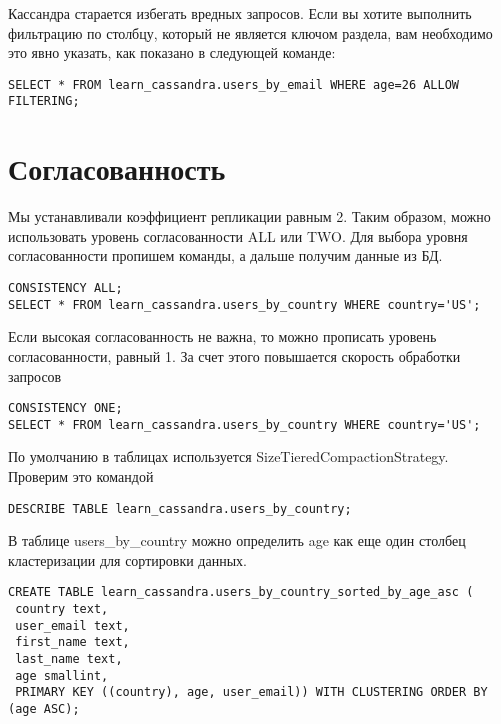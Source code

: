 Кассандра старается избегать вредных запросов.
Если вы хотите выполнить фильтрацию по столбцу, который не является ключом раздела, вам
необходимо это явно указать, как показано в следующей команде:

\begin{verbatim}
SELECT * FROM learn_cassandra.users_by_email WHERE age=26 ALLOW FILTERING;
\end{verbatim}


\section{Согласованность}

Мы устанавливали коэффициент репликации равным 2.
Таким образом, можно использовать уровень согласованности ALL или TWO.
Для выбора уровня согласованности пропишем команды, а дальше получим данные из БД.

\begin{verbatim}
CONSISTENCY ALL;
SELECT * FROM learn_cassandra.users_by_country WHERE country='US';
\end{verbatim}

Если высокая согласованность не важна, то можно прописать уровень
согласованности, равный 1.
За счет этого повышается скорость обработки запросов

\begin{verbatim}
CONSISTENCY ONE;
SELECT * FROM learn_cassandra.users_by_country WHERE country='US';
\end{verbatim}


По умолчанию в таблицах используется SizeTieredCompactionStrategy.
Проверим это командой
\begin{verbatim}
DESCRIBE TABLE learn_cassandra.users_by_country;
\end{verbatim}




В таблице users\_by\_country можно определить age как еще один столбец
кластеризации для сортировки данных.
\begin{verbatim}
CREATE TABLE learn_cassandra.users_by_country_sorted_by_age_asc (
 country text,
 user_email text,
 first_name text,
 last_name text,
 age smallint,
 PRIMARY KEY ((country), age, user_email)) WITH CLUSTERING ORDER BY (age ASC);
\end{verbatim}

